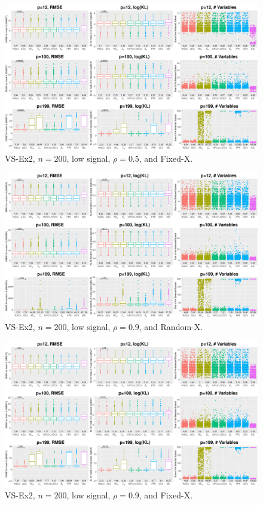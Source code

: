\begin{figure}[!ht]
\centering
\includegraphics[width=\textwidth]{figures/supplement/fixedx_VS-Ex2_n200_lsnr_rho05.eps}
\caption{VS-Ex2, $n=200$, low signal, $\rho=0.5$, and Fixed-X.}
\end{figure}
\clearpage
\begin{figure}[!ht]
\centering
\includegraphics[width=\textwidth]{figures/supplement/randomx_VS-Ex2_n200_lsnr_rho09.eps}
\caption{VS-Ex2, $n=200$, low signal, $\rho=0.9$, and Random-X.}
\end{figure}
\begin{figure}[!ht]
\centering
\includegraphics[width=\textwidth]{figures/supplement/fixedx_VS-Ex2_n200_lsnr_rho09.eps}
\caption{VS-Ex2, $n=200$, low signal, $\rho=0.9$, and Fixed-X.}
\end{figure}

